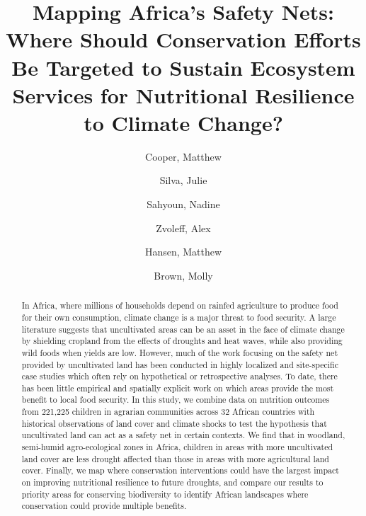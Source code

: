 \documentclass{article}
\begin{document}
\title{Mapping Africa's Safety Nets: Where Should Conservation Efforts Be Targeted to Sustain Ecosystem Services for Nutritional Resilience to Climate Change?}

\author[1,2,*]{Cooper, Matthew}
\author[2]{Silva, Julie}
\author[3]{Sahyoun, Nadine}
\author[4]{Zvoleff, Alex}
\author[2]{Hansen, Matthew}
\author[2]{Brown, Molly}


\maketitle
\begin{abstract}

In Africa, where millions of households depend on rainfed agriculture to produce food for their own consumption, climate change is a major threat to food security.  A large literature suggests that uncultivated areas can be an asset in the face of climate change by shielding cropland from the effects of droughts and heat waves, while also providing wild foods when yields are low.  However, much of the work focusing on the safety net provided by uncultivated land has been conducted in highly localized and site-specific case studies which often rely on hypothetical or retrospective analyses.  To date, there has been little empirical and spatially explicit work on which areas provide the most benefit to local food security.  In this study, we combine data on nutrition outcomes from 221,225 children in agrarian communities across 32 African countries with historical observations of land cover and climate shocks to test the hypothesis that uncultivated land can act as a safety net in certain contexts.  We find that in woodland, semi-humid agro-ecological zones in Africa, children in areas with more uncultivated land cover are less drought affected than those in areas with more agricultural land cover.  Finally, we map where conservation interventions could have the largest impact on improving nutritional resilience to future droughts, and compare our results to priority areas for conserving biodiversity to identify African landscapes where conservation could provide multiple benefits.

\end{abstract}
\end{document}
